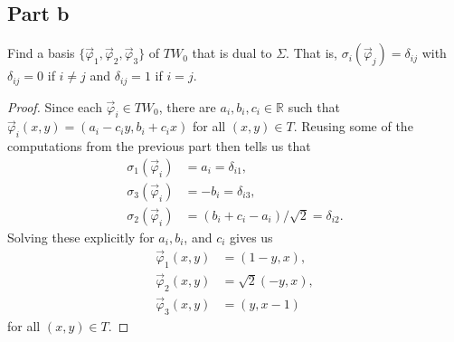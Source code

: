 \documentclass{article}
\begin{document}
\subsection*{Part b}
Find a basis $\{\vec \varphi_1, \vec \varphi_2, \vec \varphi_3\}$ of $TW_0$ that is dual to $\Sigma$.
That is, $\sigma_i(\vec\varphi_j) = \delta_{ij}$ with $\delta_{ij} = 0$ if $i \neq j$ and $\delta_{ij} = 1$ if $i = j$.
\begin{proof}
	Since each $\vec\varphi_i \in TW_0$, there are $a_i,b_i,c_i \in \mathbb R$ such that $\vec\varphi_i(x,y) = (a_i-c_iy,b_i+c_ix)$ for all $(x,y) \in T$.
	Reusing some of the computations from the previous part then tells us that
	\begin{align*}
		\sigma_1(\vec\varphi_i) & = a_i = \delta_{i1},                          \\
		\sigma_3(\vec\varphi_i) & = -b_i = \delta_{i3},                         \\
		\sigma_2(\vec\varphi_i) & = (b_i + c_i - a_i) / \sqrt{2} = \delta_{i2}.
	\end{align*}
	Solving these explicitly for $a_i, b_i$, and $c_i$ gives us
	\begin{align*}
		\vec\varphi_1(x,y) & = (1-y, x),       \\
		\vec\varphi_2(x,y) & = \sqrt{2}(-y,x), \\
		\vec\varphi_3(x,y) & = (y,x-1)
	\end{align*}
	for all $(x,y) \in T$.
\end{proof}
\end{document}
